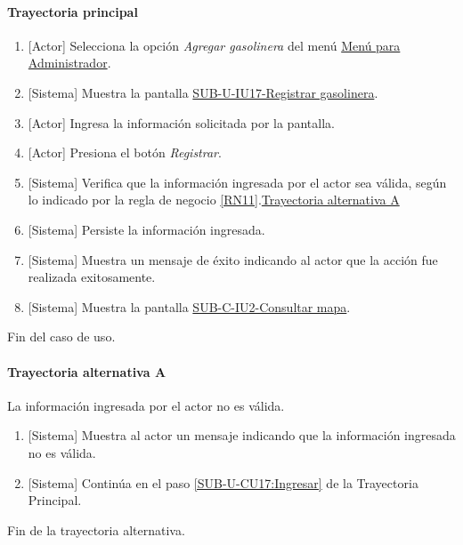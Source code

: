 \paragraph{Trayectoria principal}
	\begin{enumerate}
		\item {[Actor]} Selecciona la opción \textit{Agregar gasolinera} del menú \hyperref[fig:menu-admi]{Menú para Administrador}.
		\item {[Sistema]} Muestra la pantalla \hyperref[fig:sub-u-iu17]{SUB-U-IU17-Registrar gasolinera}.
		\item \label{SUB-U-CU17:Ingresar} {[Actor]} Ingresa la información solicitada por la pantalla.
		\item {[Actor]} Presiona el botón \textit{Registrar}.
		\item {[Sistema]} Verifica que la información ingresada por el actor sea válida, según lo indicado por la regla de negocio \ref{RN11}.\hyperref[SUB-U-CU17:TA]{Trayectoria alternativa A}
		\item {[Sistema]} Persiste la información ingresada.
		\item {[Sistema]} Muestra un mensaje de éxito indicando al actor que la acción fue realizada exitosamente.
		\item \label{SUB-U-CU17:Pantalla} {[Sistema]} Muestra la pantalla \hyperref[fig:sub-c-iu2]{SUB-C-IU2-Consultar mapa}.
	\end{enumerate}
	Fin del caso de uso.

\paragraph{Trayectoria alternativa A} \label{SUB-U-CU17:TA}
	La información ingresada por el actor no es válida.
	\begin{enumerate}[label=A\arabic*.]
		\item {[Sistema]} Muestra al actor un mensaje indicando que la información ingresada no es válida.
		\item {[Sistema]} Continúa en el paso \ref{SUB-U-CU17:Ingresar} de la Trayectoria Principal.
	\end{enumerate}
	Fin de la trayectoria alternativa.

